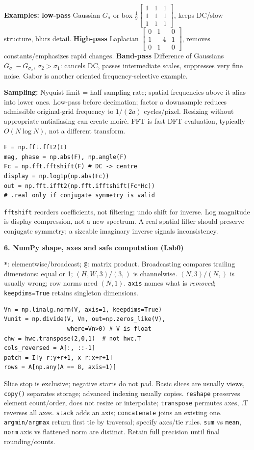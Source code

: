 \documentclass[a4paper]{article}
\newcommand{\key}[1]{\textbf{#1}}
\newcommand{\Topic}[1]{\par\vspace{1.7pt}\noindent
  {\fontsize{7.7}{8.0}\selectfont\bfseries #1}\par\vspace{0.3pt}}
\newcommand{\smat}[1]{\left[\begin{smallmatrix}#1\end{smallmatrix}\right]}
\newcounter{sheet}
\newcounter{sheetcolumn}
\newlength{\colwidth}
\newenvironment{sheetcol}[1][7.0]{\stepcounter{sheetcolumn}
  \begin{lrbox}{\columnbox}\begin{minipage}[t]{\colwidth}\vspace{0pt}
  \fontsize{#1}{\dimexpr#1pt+0.6pt\relax}\selectfont}
  {\end{minipage}\end{lrbox}
  \typeout{CV1COL|\thesheet|\thesheetcolumn|\the\dimexpr\ht\columnbox+\dp\columnbox\relax}
  \usebox{\columnbox}\ignorespacesafterend}
\begin{document}
\begin{sheetcol}[6.75]
\key{Examples: low-pass} Gaussian \(G_\sigma\) or box \(\tfrac19\smat{1&1&1\\1&1&1\\1&1&1}\), keeps DC/slow structure, blurs detail. \key{High-pass} Laplacian \(\smat{0&1&0\\1&-4&1\\0&1&0}\), removes constants/emphasizes rapid changes. \key{Band-pass} Difference of Gaussians \(G_{\sigma_1}-G_{\sigma_2}\), \(\sigma_2>\sigma_1\): cancels DC, passes intermediate scales, suppresses very fine noise. Gabor is another oriented frequency-selective example.

\key{Sampling:} Nyquist limit = half sampling rate; spatial frequencies above it alias into lower ones. Low-pass before decimation; factor a downsample reduces admissible original-grid frequency to \(1/(2a)\) cycles/pixel. Resizing without appropriate antialiasing can create moir\'e. FFT is fast DFT evaluation, typically \(O(N\log N)\), not a different transform.
\begin{lstlisting}
F = np.fft.fft2(I)
mag, phase = np.abs(F), np.angle(F)
Fc = np.fft.fftshift(F) # DC -> centre
display = np.log1p(np.abs(Fc))
out = np.fft.ifft2(np.fft.ifftshift(Fc*Hc))
# .real only if conjugate symmetry is valid
\end{lstlisting}
\texttt{fftshift} reorders coefficients, not filtering; undo shift for inverse. Log magnitude is display compression, not a new spectrum. A real spatial filter should preserve conjugate symmetry; a sizeable imaginary inverse signals inconsistency.

\Topic{6. NumPy shape, axes and safe computation (Lab0)}
\texttt{*}: elementwise/broadcast; \texttt{@}: matrix product. Broadcasting compares trailing dimensions: equal or 1; \((H,W,3)/(3,)\) is channelwise. \((N,3)/(N,)\) is usually wrong; row norms need \((N,1)\). \texttt{axis} names what is \emph{removed}; \texttt{keepdims=True} retains singleton dimensions.
\begin{lstlisting}
Vn = np.linalg.norm(V, axis=1, keepdims=True)
Vunit = np.divide(V, Vn, out=np.zeros_like(V),
                  where=Vn>0) # V is float
chw = hwc.transpose(2,0,1)  # not hwc.T
cols_reversed = A[:, ::-1]
patch = I[y-r:y+r+1, x-r:x+r+1]
rows = A[np.any(A == 8, axis=1)]
\end{lstlisting}
Slice stop is exclusive; negative starts do not pad. Basic slices are usually views, \texttt{copy()} separates storage; advanced indexing usually copies. \texttt{reshape} preserves element count/order, does not resize or interpolate; \texttt{transpose} permutes axes, .T reverses all axes. \texttt{stack} adds an axis; \texttt{concatenate} joins an existing one. \texttt{argmin/argmax} return first tie by traversal; specify axes/tie rules. \texttt{sum} vs \texttt{mean}, \texttt{norm} axis vs flattened norm are distinct. Retain full precision until final rounding/counts.


\end{sheetcol}
\end{document}
